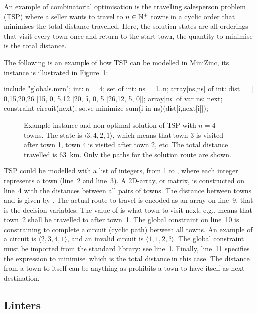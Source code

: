 \documentclass[a4paper,12pt]{article}
\begin{document}
An example of combinatorial optimisation is the travelling salesperson problem (TSP) where a
seller wants to travel to $n \in \mathbb{N}^+$ towns in a cyclic order that minimises the total
distance travelled. Here, the solution states are all orderings that visit every town once and 
return to the start town, the quantity to minimise is the total distance.

The following is an example of how TSP can be modelled in MiniZinc,
its instance is illustrated in Figure~\ref{fig:tsp}:
\begin{mznbreak}
include "globals.mzn";
int: n = 4;
set of int: ns = 1..n;
array[ns,ns] of int: dist =
  [| 0,15,20,26
   |15, 0, 5,12
   |20, 5, 0, 5
   |26,12, 5, 0|];
array[ns] of var ns: next;
constraint circuit(next);
solve minimize sum(i in ns)(dist[i,next[i]]);
\end{mznbreak}

\begin{figure}[t]
  \centering
  
  \caption{Example instance and non-optimal solution of TSP with $n=4$ towns. The state is
    $\langle 3,4,2,1 \rangle$, which means that town 3 is visited after town 1, town 4 is
    visited after town 2, etc. The total distance travelled is \SI{63}{km}. Only the paths
    for the solution route are shown.}%
  \label{fig:tsp}
\end{figure}

TSP could be modelled with a list of  integers, from 1 to , where each
integer represents a town (line~2 and line~3). A 2D-array, or matrix, is constructed on
line~4 with the distances between all pairs of towns. 
The distance between towns  and  is given by .
The actual route to travel is encoded as an array on line~9, that is the decision variables.
The value of  is what town to visit next; e.g.,  means that
town~2 shall be travelled to after town~1. The global constraint  on line~10
is constraining  to complete a circuit (cyclic path) between all towns. An example of a
circuit is $\langle 2,3,4,1 \rangle$, and an invalid circuit is $\langle 1,1,2,3 \rangle$.
The global constraint must be imported from the standard library: see line~1. Finally,
line~11 specifies the expression to minimise, which is the total distance in this case. The
distance from a town to itself can be anything as  prohibits a town to have
itself as next destination.

\subsection{Linters}\label{sec:bkg:linter}
\end{document}
